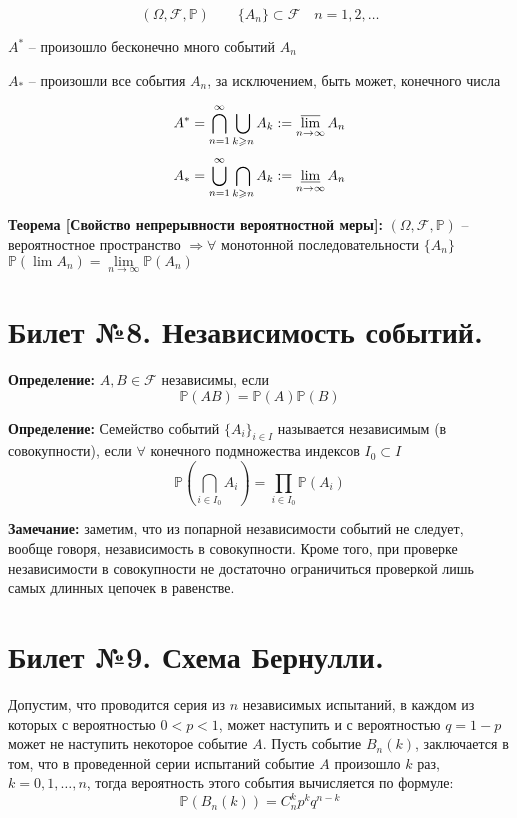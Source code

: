 \[(\Omega, \mathscr{F}, \mathbb{P}) \hspace{2em} \{A_n\} \subset \mathscr{F} \hspace{1em}n=1, 2, \ldots \]

$A^{*}$ -- произошло бесконечно много событий $A_n$

$A_{*}$ -- произошли все события $A_n$, за исключением, быть может, конечного числа

\[A^{*} = \bigcap_{n=1}^{\infty} \bigcup_{k \geqslant n} A_k := \varlimsup_{n \to \infty} A_n \]
\[A_{*} = \bigcup_{n=1}^{\infty} \bigcap_{k \geqslant n} A_k := \varliminf_{n \to \infty} A_n \]

\textbf{Теорема [Свойство непрерывности вероятностной меры]:} $(\Omega, \mathscr{F}, \mathbb{P})$ -- вероятностное пространство $\Rightarrow \forall$ монотонной последовательности $\{A_n\}$ $\mathbb{P}(\lim A_n) = \lim\limits_{n \to \infty} \mathbb{P}(A_n)$

\section{Билет №8. Независимость событий.}

\hspace*{\parindent} \textbf{Определение:} $A, B \in \mathscr{F}$ независимы, если
\[ \mathbb{P}(AB) = \mathbb{P}(A) \mathbb{P}(B) \]

\textbf{Определение:} Семейство событий $\{A_i\}_{i \in I}$ называется независимым (в совокупности), если $\forall$ конечного подмножества индексов $I_0 \subset I$
\[\mathbb{P}(\bigcap_{i \in I_0}A_i) = \prod_{i \in I_0} \mathbb{P}(A_i)\]

\textbf{Замечание:} заметим, что из попарной независимости событий не следует, вообще говоря, независимость в совокупности. Кроме того, при проверке независимости
в совокупности не достаточно ограничиться проверкой лишь самых длинных
цепочек в равенстве. 

\section{Билет №9. Схема Бернулли.}

\hspace*{\parindent} Допустим, что проводится серия из $n$ независимых испытаний, в каждом из которых с вероятностью $0 < p < 1$, может наступить
и с вероятностью $q = 1 - p$ может не наступить некоторое событие $A$. Пусть событие $B_n (k)$, заключается в том, что в проведенной серии испытаний событие $A$ произошло $k$ раз, $k = 0, 1, \dots, n$, тогда вероятность этого события вычисляется по формуле:
\begin{equation*}
	\mathbb{P}(B_n (k)) = C_{n}^{k} p^k q^{n - k}
\end{equation*}

